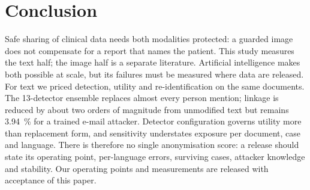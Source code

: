 \section{Conclusion}\label{sec:conclusion}

Safe sharing of clinical data needs both modalities protected: a guarded image does not compensate
for a report that names the patient. This study measures the text half; the image half is a separate
literature.
Artificial intelligence makes both possible at scale, but its failures must be measured where data
are released. For text we priced detection, utility and re-identification on the same documents. The 13-detector ensemble replaces almost every person mention; linkage is reduced by about two orders of magnitude from unmodified text but remains \SI{3.94}{\percent} for a trained e-mail attacker. Detector configuration governs utility more than replacement form, and sensitivity understates
exposure per document, case and language. There is therefore no single anonymisation score: a
release should state its operating point, per-language errors, surviving cases, attacker knowledge
and stability. Our operating points and measurements are released with acceptance of this paper.

